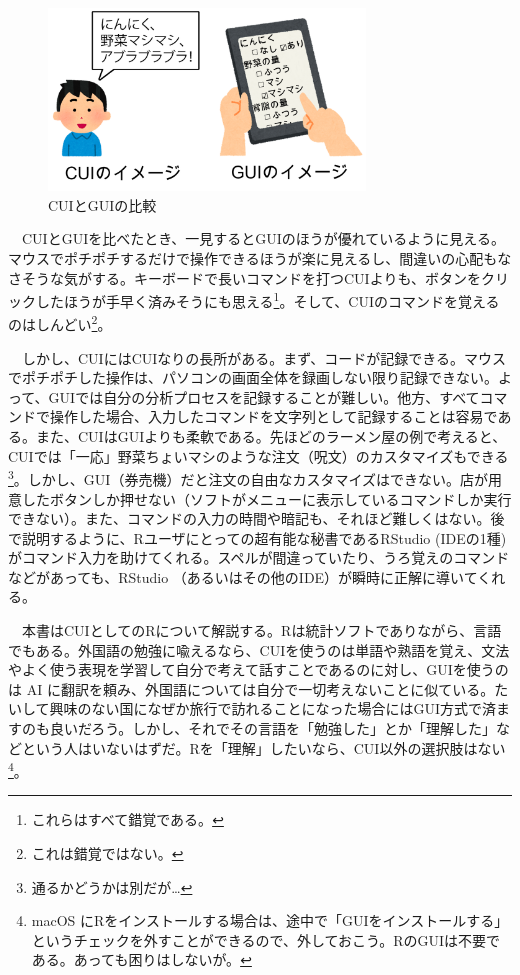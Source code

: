 \documentclass[
  a4paper,
  pandoc,
  ja=standard,
  jafont=haranoaji]{bxjsbook}
\begin{document}
\begin{figure}

{\centering \includegraphics[width=0.75\textwidth,height=\textheight]{./Figs/AboutR/CUI_GUI.png}

}

\caption{\label{fig-cui_gui}CUIとGUIの比較}

\end{figure}

　CUIとGUIを比べたとき、一見するとGUIのほうが優れているように見える。マウスでポチポチするだけで操作できるほうが楽に見えるし、間違いの心配もなさそうな気がする。キーボードで長いコマンドを打つCUIよりも、ボタンをクリックしたほうが手早く済みそうにも思える\footnote{これらはすべて錯覚である。}。そして、CUIのコマンドを覚えるのはしんどい\footnote{これは錯覚ではない。}。

　しかし、CUIにはCUIなりの長所がある。まず、コードが記録できる。マウスでポチポチした操作は、パソコンの画面全体を録画しない限り記録できない。よって、GUIでは自分の分析プロセスを記録することが難しい。他方、すべてコマンドで操作した場合、入力したコマンドを文字列として記録することは容易である。また、CUIはGUIよりも柔軟である。先ほどのラーメン屋の例で考えると、CUIでは「一応」野菜ちょいマシのような注文（呪文）のカスタマイズもできる\footnote{通るかどうかは別だが\ldots{}}。しかし、GUI（券売機）だと注文の自由なカスタマイズはできない。店が用意したボタンしか押せない（ソフトがメニューに表示しているコマンドしか実行できない）。また、コマンドの入力の時間や暗記も、それほど難しくはない。後で説明するように、Rユーザにとっての超有能な秘書であるRStudio
(IDEの1種)
がコマンド入力を助けてくれる。スペルが間違っていたり、うろ覚えのコマンドなどがあっても、RStudio
（あるいはその他のIDE）が瞬時に正解に導いてくれる。

　本書はCUIとしてのRについて解説する。Rは統計ソフトでありながら、言語でもある。外国語の勉強に喩えるなら、CUIを使うのは単語や熟語を覚え、文法やよく使う表現を学習して自分で考えて話すことであるのに対し、GUIを使うのは
AI
に翻訳を頼み、外国語については自分で一切考えないことに似ている。たいして興味のない国になぜか旅行で訪れることになった場合にはGUI方式で済ますのも良いだろう。しかし、それでその言語を「勉強した」とか「理解した」などという人はいないはずだ。Rを「理解」したいなら、CUI以外の選択肢はない\footnote{macOS
  にRをインストールする場合は、途中で「GUIをインストールする」というチェックを外すことができるので、外しておこう。RのGUIは不要である。あっても困りはしないが。}。
\end{document}

